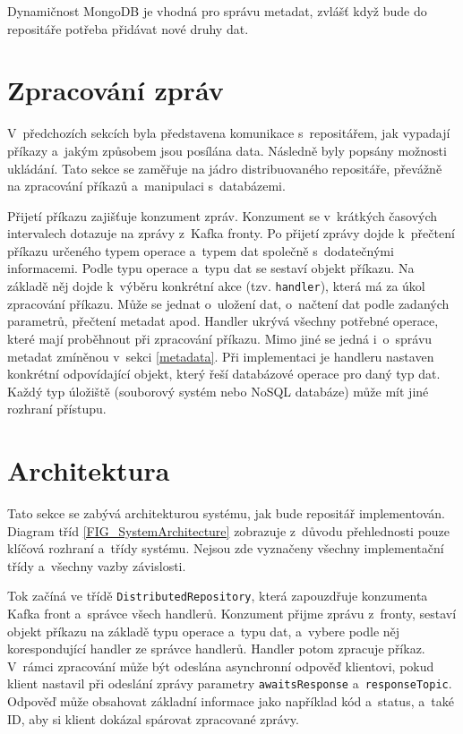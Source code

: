 Dynamičnost MongoDB je vhodná pro správu metadat, zvlášť když bude do repositáře potřeba přidávat nové druhy dat.

\section{Zpracování zpráv}
V~předchozích sekcích byla představena komunikace s~repositářem, jak vypadají příkazy a~jakým způsobem jsou posílána data. Následně byly popsány možnosti ukládání. Tato sekce se zaměřuje na jádro distribuovaného repositáře, převážně na zpracování příkazů a~manipulaci s~databázemi.

Přijetí příkazu zajišťuje konzument zpráv. Konzument se v~krátkých časových intervalech dotazuje na zprávy z~Kafka fronty. Po přijetí zprávy dojde k~přečtení příkazu určeného typem operace a~typem dat společně s~dodatečnými informacemi. Podle typu operace a~typu dat se sestaví objekt příkazu. Na základě něj dojde k~výběru konkrétní akce (tzv. \texttt{handler}), která má za úkol zpracování příkazu. Může se jednat o~uložení dat, o~načtení dat podle zadaných parametrů, přečtení metadat apod. Handler ukrývá všechny potřebné operace, které mají proběhnout při zpracování příkazu. Mimo jiné se jedná i~o~správu metadat zmíněnou v~sekci \ref{metadata}. Při implementaci je handleru nastaven konkrétní odpovídající objekt, který řeší databázové operace pro daný typ dat. Každý typ úložiště (souborový systém nebo NoSQL databáze) může mít jiné rozhraní přístupu.

\section{Architektura} \label{archSection}
Tato sekce se zabývá architekturou systému, jak bude repositář implementován. Diagram tříd \ref{FIG_SystemArchitecture} zobrazuje z~důvodu přehlednosti pouze klíčová rozhraní a~třídy systému. Nejsou zde vyznačeny všechny implementační třídy a~všechny vazby závislosti.

Tok začíná ve třídě \texttt{DistributedRepository}, která zapouzdřuje konzumenta Kafka front a~správce všech handlerů. Konzument přijme zprávu z~fronty, sestaví objekt příkazu na základě typu operace a~typu dat, a~vybere podle něj korespondující handler ze správce handlerů. Handler potom zpracuje příkaz. V~rámci zpracování může být odeslána asynchronní odpověď klientovi, pokud klient nastavil při odeslání zprávy parametry \texttt{awaitsResponse} a~\texttt{responseTopic}. Odpověď může obsahovat základní informace jako například kód a~status, a~také ID, aby si klient dokázal spárovat zpracované zprávy.

